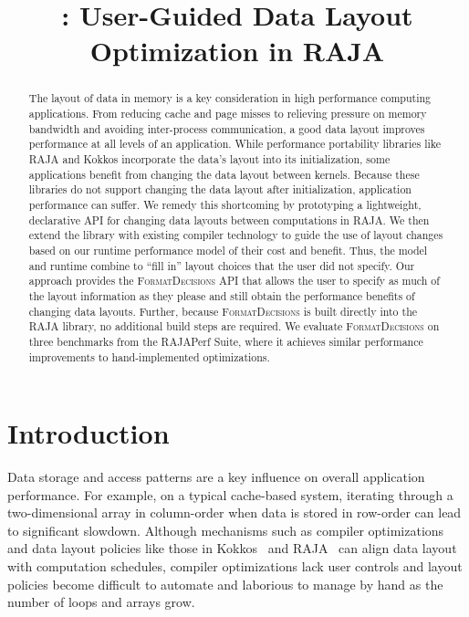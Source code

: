 \documentclass[sigconf,review=true]{acmart}
\title{\FormatDecisions{}: User-Guided Data Layout Optimization in RAJA}
\newcommand{\FormatDecisions}[0]{{\textsc{FormatDecisions}}}
\begin{document}
\begin{abstract}

The layout of data in memory is a key consideration in high performance computing applications.
From reducing cache and page misses to relieving pressure on memory bandwidth and avoiding inter-process communication, a good data layout improves performance at all levels of an application.
While performance portability libraries like RAJA and Kokkos incorporate the data's layout into its initialization, some applications benefit from changing the data layout between kernels.
Because these libraries do not support changing the data layout after initialization, application performance can suffer. 
We remedy this shortcoming by prototyping a lightweight, declarative API for changing data layouts between computations in RAJA.
We then extend the library with existing compiler technology to guide the use of layout changes based on our runtime performance model of their cost and benefit.
Thus, the model and runtime combine to \enquote{fill in} layout choices that the user did not specify.
Our approach provides the \FormatDecisions{} API that allows the user to specify as much of the layout information as they please and still obtain the performance benefits of changing data layouts.  
Further, because \FormatDecisions{} is built directly into the RAJA library, no additional build steps are required.
We evaluate \FormatDecisions{} on three benchmarks from the RAJAPerf Suite, where it achieves similar performance improvements to hand-implemented optimizations.
\end{abstract}
\maketitle
\def\@textbottom{\vskip \z@ \@plus 1pt}




\section{Introduction}
Data storage and access patterns are a key influence on overall application performance. 
For example, on a typical cache-based system, iterating through a two-dimensional array in column-order when data is stored in row-order can lead to significant slowdown. 
Although mechanisms such as compiler optimizations~\cite{wolf1991data,bixby1994automatic}
and data layout policies like those in Kokkos~\cite{edwards2014kokkos} and RAJA~\cite{hornung2014RAJA} can align data layout with computation schedules, compiler optimizations lack user controls and layout policies become difficult to automate and laborious to manage by hand as the number of loops and arrays grow.
\end{document}
